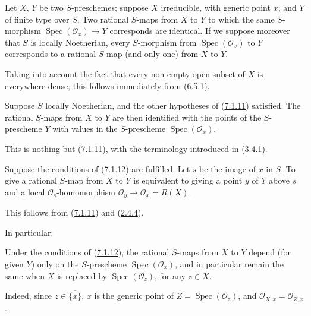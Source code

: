 \begin{proposition}[7.1.11]
\label{I.7.1.11}
Let $X$, $Y$ be two $S$-preschemes; suppose $X$ irreducible, with generic
point $x$, and $Y$ of finite type over $S$. Two rational $S$-maps from $X$ to
$Y$ to which the same $S$-morphism $\operatorname{Spec}(\mathscr{O}_x)\to Y$
corresponds are identical. If we suppose moreover that $S$ is locally
Noetherian, every $S$-morphism from $\operatorname{Spec}(\mathscr{O}_x)$ to
$Y$ corresponds to a rational $S$-map (and only one) from $X$ to $Y$.
\end{proposition}

Taking into account the fact that every non-empty open subset of $X$ is
everywhere dense, this follows immediately from
(\hyperref[I.6.5.1]{6.5.1}).

\begin{corollary}[7.1.12]
\label{I.7.1.12}
Suppose $S$ locally Noetherian, and the other hypotheses of
\textup{(\hyperref[I.7.1.11]{7.1.11})} satisfied. The rational $S$-maps from $X$ to
$Y$ are then identified with the points of the $S$-prescheme $Y$ with values
in the $S$-prescheme $\operatorname{Spec}(\mathscr{O}_x)$.
\end{corollary}

This is nothing but (\hyperref[I.7.1.11]{7.1.11}), with the terminology
introduced in (\hyperref[I.3.4.1]{3.4.1}).

\begin{corollary}[7.1.13]
\label{I.7.1.13}
Suppose the conditions of \textup{(\hyperref[I.7.1.12]{7.1.12})} are fulfilled. Let
$s$ be the image of $x$ in $S$. To give a rational $S$-map from $X$ to $Y$ is
equivalent to giving a point $y$ of $Y$ above $s$ and a local
$\mathscr{O}_s$-homomorphism
$\mathscr{O}_y\to\mathscr{O}_x=R(X)$.
\end{corollary}

This follows from (\hyperref[I.7.1.11]{7.1.11}) and
(\hyperref[I.2.4.4]{2.4.4}).

In particular:

\begin{corollary}[7.1.14]
\label{I.7.1.14}
Under the conditions of \textup{(\hyperref[I.7.1.12]{7.1.12})}, the rational
$S$-maps from $X$ to $Y$ depend (for given $Y$) only on the
$S$-prescheme $\operatorname{Spec}(\mathscr{O}_x)$, and in particular remain
the same when $X$ is replaced by
$\operatorname{Spec}(\mathscr{O}_z)$, for any $z\in X$.
\end{corollary}

Indeed, since $z\in\overline{\{x\}}$, $x$ is the generic point of
$Z=\operatorname{Spec}(\mathscr{O}_z)$, and
$\mathscr{O}_{X,x}=\mathscr{O}_{Z,x}$.


